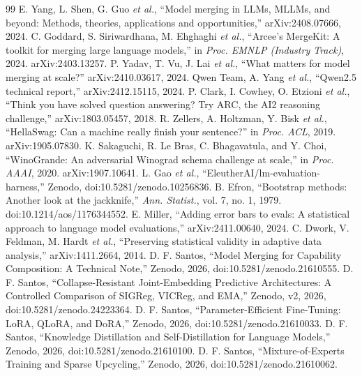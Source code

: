 \documentclass[conference]{IEEEtran}
\begin{document}
\begin{thebibliography}{99}
 E. Yang, L. Shen, G. Guo \emph{et al.}, ``Model merging in LLMs, MLLMs, and beyond: Methods, theories, applications and opportunities,'' arXiv:2408.07666, 2024.
 C. Goddard, S. Siriwardhana, M. Ehghaghi \emph{et al.}, ``Arcee's MergeKit: A toolkit for merging large language models,'' in \emph{Proc. EMNLP (Industry Track)}, 2024. arXiv:2403.13257.
 P. Yadav, T. Vu, J. Lai \emph{et al.}, ``What matters for model merging at scale?'' arXiv:2410.03617, 2024.
 Qwen Team, A. Yang \emph{et al.}, ``Qwen2.5 technical report,'' arXiv:2412.15115, 2024.
 P. Clark, I. Cowhey, O. Etzioni \emph{et al.}, ``Think you have solved question answering? Try ARC, the AI2 reasoning challenge,'' arXiv:1803.05457, 2018.
 R. Zellers, A. Holtzman, Y. Bisk \emph{et al.}, ``HellaSwag: Can a machine really finish your sentence?'' in \emph{Proc. ACL}, 2019. arXiv:1905.07830.
 K. Sakaguchi, R. Le Bras, C. Bhagavatula, and Y. Choi, ``WinoGrande: An adversarial Winograd schema challenge at scale,'' in \emph{Proc. AAAI}, 2020. arXiv:1907.10641.
 L. Gao \emph{et al.}, ``EleutherAI/lm-evaluation-harness,'' Zenodo, doi:10.5281/zenodo.10256836.
 B. Efron, ``Bootstrap methods: Another look at the jackknife,'' \emph{Ann. Statist.}, vol. 7, no. 1, 1979. doi:10.1214/aos/1176344552.
 E. Miller, ``Adding error bars to evals: A statistical approach to language model evaluations,'' arXiv:2411.00640, 2024.
 C. Dwork, V. Feldman, M. Hardt \emph{et al.}, ``Preserving statistical validity in adaptive data analysis,'' arXiv:1411.2664, 2014.
 D. F. Santos, ``Model Merging for Capability Composition: A Technical Note,'' Zenodo, 2026, doi:10.5281/zenodo.21610555.
 D. F. Santos, ``Collapse-Resistant Joint-Embedding Predictive Architectures: A Controlled Comparison of SIGReg, VICReg, and EMA,'' Zenodo, v2, 2026, doi:10.5281/zenodo.24223364.
 D. F. Santos, ``Parameter-Efficient Fine-Tuning: LoRA, QLoRA, and DoRA,'' Zenodo, 2026, doi:10.5281/zenodo.21610033.
 D. F. Santos, ``Knowledge Distillation and Self-Distillation for Language Models,'' Zenodo, 2026, doi:10.5281/zenodo.21610100.
 D. F. Santos, ``Mixture-of-Experts Training and Sparse Upcycling,'' Zenodo, 2026, doi:10.5281/zenodo.21610062.

\end{thebibliography}
\end{document}
